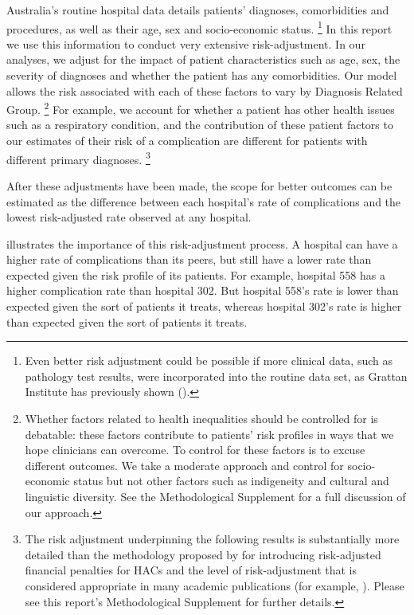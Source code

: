 \documentclass[FrontPage]{grattan}
\begin{document}
Australia's routine hospital data details patients' diagnoses, comorbidities and procedures, as well as their age, sex and socio-economic status.%
	\footnote{Even better risk adjustment could be possible if more clinical data, such as pathology test results, were incorporated into the routine data set, as Grattan Institute has previously shown (\textcite{DuckettEtAl-2015-Questionable-care}).}
In this report we use this information to conduct very extensive risk-adjustment.
In our analyses, we adjust for the impact of patient characteristics such as age, sex, the severity of diagnoses and whether the patient has any comorbidities.
Our model allows the risk associated with each of these factors to vary by Diagnosis Related Group.%
	\footnote{Whether factors related to health inequalities should be controlled for is debatable: these factors contribute to patients' risk profiles in ways that we hope clinicians can overcome.
	To control for these factors is to excuse different outcomes.
	We take a moderate approach and control for socio-economic status but not other factors such as indigeneity and cultural and linguistic diversity.
	See the Methodological Supplement for a full discussion of our approach.}
For example, we account for whether a patient has other health issues such as a respiratory condition, and the contribution of these patient factors to our estimates of their risk of a complication are different for patients with different primary diagnoses.%
	\footnote{The risk adjustment underpinning the following results is substantially more detailed than the methodology proposed by \textcite{IHPA-2017-Risk-adj-model-tech-specs} for introducing risk-adjusted financial penalties for HACs and the level of risk-adjustment that is considered appropriate in many academic publications (for example, \textcite{zhang2013patient}).
	Please see this report's Methodological Supplement for further details.}

After these adjustments have been made, the scope for better outcomes can be estimated as the difference between each hospital's rate of complications and the lowest risk-adjusted rate observed at any hospital.

  illustrates the importance of this risk-adjustment process.
A hospital can have a higher rate of complications than its peers, but still have a lower rate than expected given the risk profile of its patients.
For example, hospital 558 has a higher complication rate than hospital 302.
But hospital 558's rate is lower than expected given the sort of patients it treats, whereas hospital 302's rate is higher than expected given the sort of patients it treats.
\end{document}
